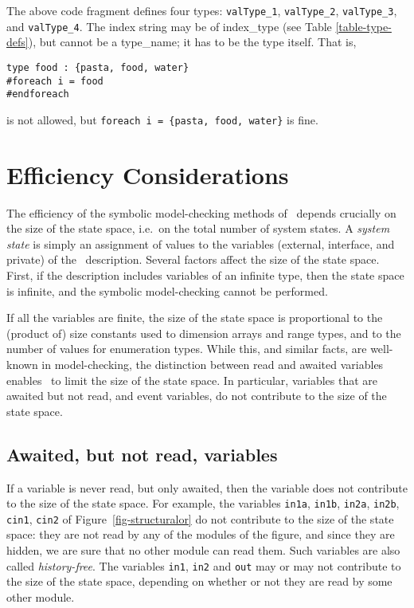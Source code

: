 {\mypar
The above code fragment defines four types: {\tt valType\_1}, {\tt valType\_2},
{\tt valType\_3}, and {\tt valType\_4}. The index string may be of
index\_type (see Table \ref{table-type-defs}), but cannot be a
type\_name; it has to be the type itself. That is, 

\mypar
\begin{verbatim}
type food : {pasta, food, water}
#foreach i = food
#endforeach
\end{verbatim}
is not allowed, but {\tt foreach i = \{pasta, food, water\}} is fine. 

\section{Efficiency Considerations}
\label{sec-efficiency}

The efficiency of the symbolic model-checking
methods  of \mocha\ depends
crucially on the size of the state space, i.e.\ on
the total number of system states.  A {\em system
state\/} is simply an assignment of values to the
variables (external, interface, and private) of the \rem\
description.  Several factors affect the size of the state space.
First, if the description includes variables of an infinite type, then
the state space is infinite, and the symbolic model-checking cannot be
performed.  

If all the variables are finite, the size of the state space is
proportional to the (product of) size constants used to dimension
arrays and range types, and to the number of values for enumeration
types.  While this, and similar facts, are well-known in
model-checking, the distinction between read and awaited variables
enables \mocha\ to limit the size of the state space.  In particular,
variables that are awaited but not read, and event variables, do not
contribute to the size of the state space. 


\subsection{Awaited, but not read, variables}

If a variable is never read, but only
awaited, then the
variable does not contribute to the size of the state space.  For
example, the variables {\tt in1a}, {\tt in1b}, {\tt in2a}, {\tt in2b},
{\tt cin1}, {\tt cin2} of Figure~\ref{fig-structuralor} do not
contribute to the size of the state space: they are not read by any of
the modules of the figure, and since they are hidden, we are sure that
no other module can read them. Such variables are also called {\em
history-free}\index{variable!history-free}.  The variables {\tt in1}, {\tt in2} and
{\tt out} may or may not contribute to the size of the state space,
depending on whether or not they are read by some other module. 

}
